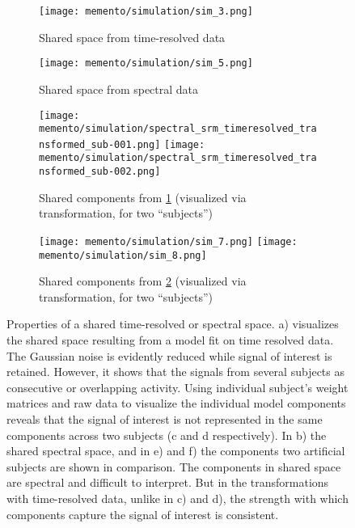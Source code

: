 \begin{figure}
	\centering
	\begin{subfigure}{.4\textwidth}
		\texttt{[image: memento/simulation/sim\_3.png]}
		\caption{Shared space from time-resolved data}
		\label{fig:sim-timeresolved-shared}
	\end{subfigure}
	\begin{subfigure}{.4\textwidth}
		\texttt{[image: memento/simulation/sim\_5.png]}
		\caption{Shared space from spectral data}
		\label{fig:sim-spectral-shared}
	\end{subfigure}
	\centering
	\begin{subfigure}{1.\textwidth}
		\centering
		\texttt{[image: memento/simulation/spectral\_srm\_timeresolved\_transformed\_sub-001.png]}
		\texttt{[image: memento/simulation/spectral\_srm\_timeresolved\_transformed\_sub-002.png]}
		\caption{Shared components from \ref{fig:sim-timeresolved-shared} (visualized via transformation, for two ``subjects'')}
		\label{fig:sim-resolved-transformed}
	\end{subfigure}
	\centering
	\begin{subfigure}{1.\textwidth}
		\centering
		\texttt{[image: memento/simulation/sim\_7.png]}
		\texttt{[image: memento/simulation/sim\_8.png]}
		\caption{Shared components from \ref{fig:sim-spectral-shared} (visualized via transformation, for two ``subjects'')}
		\label{fig:sim-shared-transformed}
	\end{subfigure}

	\caption[Properties of a shared time-resolved or spectral space]{Properties of a shared time-resolved or spectral space. a) visualizes the shared space resulting from a model fit on time resolved data. The Gaussian noise is evidently reduced while signal of interest is retained. However, it shows that the signals from several subjects as consecutive or overlapping activity. Using individual subject's weight matrices and raw data to visualize the individual model components reveals that the signal of interest is not represented in the same components across two subjects (c and d respectively). In b) the shared spectral space, and in e) and f) the components two artificial subjects are shown in comparison. The components in shared space are spectral and difficult to interpret. But in the transformations with time-resolved data, unlike in c) and d), the strength with which components capture the signal of interest is consistent.}
	\label{fig:sim-spectral}
\end{figure}



